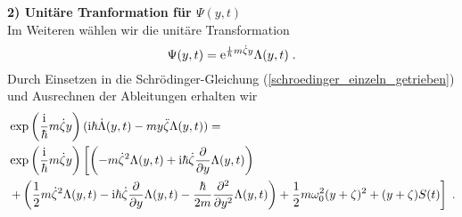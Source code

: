       \textbf{2) Unitäre Tranformation für $\Psi(y,t)$}\\
      Im Weiteren wählen wir die unitäre Transformation
      \begin{equation}
        \Psi(y,t) = \text e^{\frac{\text i}{\hbar}m\dot \zeta y}\Lambda(y,t) \; .
      \end{equation}
      Durch Einsetzen in die Schrödinger-Gleichung (\ref{schroedinger_einzeln_getrieben}) und Ausrechnen der Ableitungen erhalten wir
      \begin{align}
        \begin{split}
          &\exp\left(\frac{\text i}{\hbar}m\dot \zeta y\right)(\text i \hbar \dot \Lambda(y,t) - my \ddot{\zeta}\Lambda(y,t)) =\\
           &\exp\left(\frac{\text i}{\hbar}m\dot \zeta y\right) \left[\left(-m\dot \zeta^2 \Lambda(y,t) + \text i \hbar \dot \zeta \frac{\partial}{\partial y} \Lambda(y,t) \right) \right. \\
           &\left. + \left(\frac{1}{2}m\dot \zeta^2 \Lambda(y,t) - \text{i} \hbar \dot \zeta \frac{\partial}{\partial y} \Lambda(y,t) - \frac{\hbar}{2m}\frac{\partial^2}{\partial y^2} \Lambda(y,t)  \right)
          + \frac{1}{2}m\omega_0^2(y+\zeta)^2  + (y+\zeta)S(t)  \right] \; .
        \end{split}
      \end{align}
      \iffalse
      Durch Einsetzen in die Schrödinger-Gleichung und Ausrechnen der Ableitungen erhalten wir für die linke Seite von (\ref{schroedinger_einzeln_getrieben})
      \text e^{\frac{\text i}{\hbar}m\dot \zeta y}(\text i \hbar \dot \Lambda(y,t) - my \ddot{\zeta}\Lambda(y,t))
      \begin{equation}
      \end{equation}
      und für die rechte Seite
      \begin{align}
        \begin{split}
        \text e^{\frac{\text i}{\hbar}m\dot \zeta y} \left[\left(-m\dot \zeta^2 \Lambda(y,t) + \text i \hbar \dot \zeta \frac{\partial}{\partial y} \Lambda(y,t) \right) + \left(\frac{1}{2}m\dot \zeta^2 \Lambda(y,t) - \text{i} \hbar \dot \zeta \frac{\partial}{\partial y} \Lambda(y,t) - \frac{\hbar}{2m}\frac{\partial^2}{\partial y^2} \Lambda(y,t)  \right) \right. \\
        \left. + \left(\frac{1}{2}m\omega_0^2y^2\Lambda(y,t) + m\omega_0^2y\zeta\Lambda(y,t) + \frac{1}{2}m\omega_0^2 \zeta^2\Lambda(y,t)) \right) + \left(-yS(t)\Lambda(y,t) - \zeta S(t)\Lambda(y,t) \right) \right]
      \end{split}
      \end{align}
      \fi

